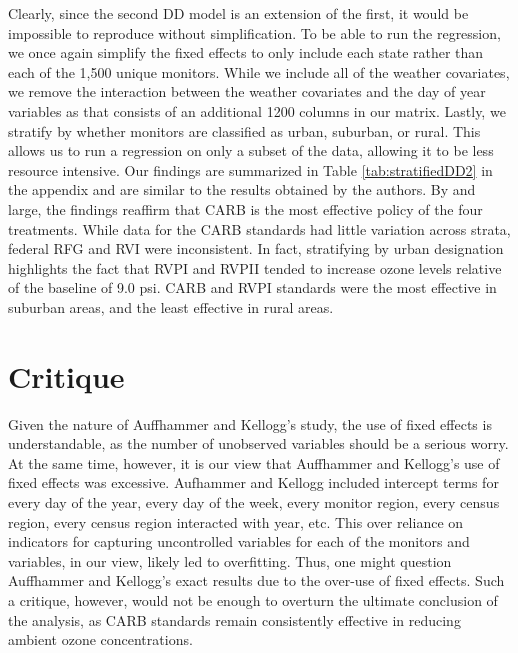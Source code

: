 \documentclass{article}
\begin{document}
Clearly, since the second DD model is an extension of the first, it would be impossible to reproduce without simplification. To be able to run the regression, we once again simplify the fixed effects to only include each state rather than each of the 1,500 unique monitors. While we include all of the weather covariates, we remove the interaction between the weather covariates and the day of year variables as that consists of an additional 1200 columns in our matrix. Lastly, we stratify by whether monitors are classified as urban, suburban, or rural. This allows us to run a regression on only a subset of the data, allowing it to be less resource intensive. Our findings are summarized in Table \ref{tab:stratifiedDD2} in the appendix and are similar to the results obtained by the authors. By and large, the findings reaffirm that CARB is the most effective policy of the four treatments. While data for the CARB standards had little variation across strata, federal RFG and RVI were inconsistent. In fact, stratifying by urban designation highlights the fact that RVPI and RVPII tended to increase ozone levels relative of the baseline of 9.0 psi. CARB and RVPI standards were the most effective in suburban areas, and the least effective in rural areas.

\section{Critique}

Given the nature of Auffhammer and Kellogg's study, the use of fixed effects is understandable, as the number of unobserved variables should be a serious worry. At the same time, however, it is our view that Auffhammer and Kellogg's use of fixed effects was excessive. Aufhammer and Kellogg included intercept terms for every day of the year, every day of the week, every monitor region, every census region, every census region interacted with year, etc. This over reliance on indicators for capturing uncontrolled variables for each of the monitors and variables, in our view, likely led to overfitting. Thus, one might question Auffhammer and Kellogg's exact results due to the over-use of fixed effects. Such a critique, however, would not be enough to overturn the ultimate conclusion of the analysis, as CARB standards remain consistently effective in reducing ambient ozone concentrations. 
\end{document}
